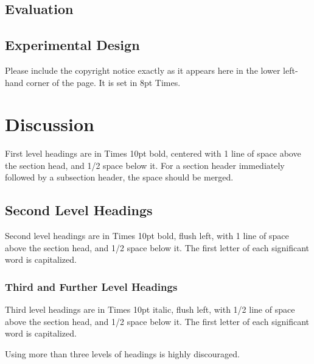 \documentclass{article}
\begin{document}
\subsection{Evaluation}



\subsection{Experimental Design}

Please include the copyright notice exactly as it appears here in the lower left-hand corner of the page.
It is set in 8pt Times.


\section{Discussion}

First level headings are in Times 10pt bold,
centered with 1 line of space above the section head, and 1/2 space below it.
For a section header immediately followed by a subsection header, the space should be merged.

\subsection{Second Level Headings}

Second level headings are in Times 10pt bold, flush left,
with 1 line of space above the section head, and 1/2 space below it.
The first letter of each significant word is capitalized.

\subsubsection{Third and Further Level Headings}

Third level headings are in Times 10pt italic, flush left,
with 1/2 line of space above the section head, and 1/2 space below it.
The first letter of each significant word is capitalized.

Using more than three levels of headings is highly discouraged.



\end{document}
